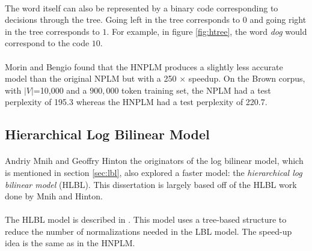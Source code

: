 \paragraph{}
The word itself can also be represented by a binary code corresponding to decisions through the tree. Going left in the tree corresponds to $0$ and going right in the tree corresponds to $1$. For example, in figure \ref{fig:htree}, the word \emph{dog} would correspond to the code $10$.

\paragraph{}
Morin and Bengio found that the HNPLM produces a slightly less accurate model than the original NPLM but with a 250 $\times$ speedup. On the Brown corpus, with $|V|$=10,000 and a $900,000$ token training set, the NPLM had a test perplexity of 195.3 whereas the HNPLM had a test perplexity of 220.7.

\subsection{Hierarchical Log Bilinear Model} \label{sec:HLBL}
\paragraph{}
Andriy Mnih and Geoffry Hinton the originators of the log bilinear model, which is mentioned in section \ref{sec:lbl},  also explored a faster model: the \emph{hierarchical log bilinear model} (HLBL). This dissertation is largely based off of the HLBL work done by Mnih and Hinton. 

\paragraph{}
The HLBL model is described in \cite{MnihHinton2009}. This model uses a tree-based structure to reduce the number of normalizations needed in the LBL model. The speed-up idea is the same as in the HNPLM.

